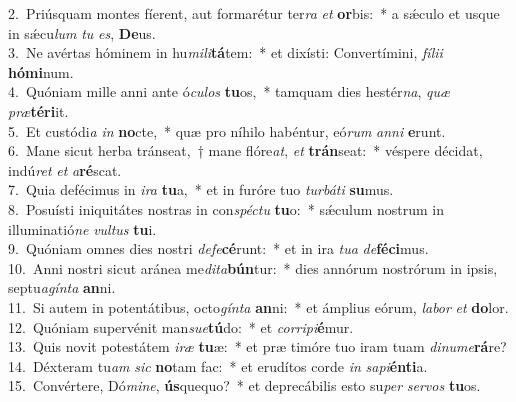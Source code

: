 {2.~}Priúsquam montes fíerent, aut formarétur ter\textit{ra} \textit{et} \textbf{or}bis:~* a sǽculo et usque in sǽcu\textit{lum} \textit{tu} \textit{es}, \textbf{De}us.\\
{3.~}Ne avértas hóminem in hu\textit{mi}\textit{li}\textbf{tá}tem:~* et dixísti: Convertímini, \textit{fí}\textit{li}\textit{i} \textbf{hó}\textbf{mi}num.\\
{4.~}Quóniam mille anni ante ó\textit{cu}\textit{los} \textbf{tu}os,~* tamquam dies hestér\textit{na}, \textit{quæ} \textit{præ}\textbf{té}\textbf{ri}it.\\
{5.~}Et custódi\textit{a} \textit{in} \textbf{no}cte,~* quæ pro níhilo habéntur, eó\textit{rum} \textit{an}\textit{ni} \textbf{e}runt.\\
{6.~}Mane sicut herba tránseat,~† mane flóre\textit{at}, \textit{et} \textbf{trán}seat:~* véspere décidat, indú\textit{ret} \textit{et} \textit{a}\textbf{ré}scat.\\
{7.~}Quia defécimus in \textit{i}\textit{ra} \textbf{tu}a,~* et in furóre tuo \textit{tur}\textit{bá}\textit{ti} \textbf{su}mus.\\
{8.~}Posuísti iniquitátes nostras in con\textit{spé}\textit{ctu} \textbf{tu}o:~* sǽculum nostrum in illuminatió\textit{ne} \textit{vul}\textit{tus} \textbf{tu}i.\\
{9.~}Quóniam omnes dies nostri \textit{de}\textit{fe}\textbf{cé}runt:~* et in ira \textit{tu}\textit{a} \textit{de}\textbf{fé}\textbf{ci}mus.\\
{10.~}Anni nostri sicut aránea me\textit{di}\textit{ta}\textbf{bún}tur:~* dies annórum nostrórum in ipsis, septu\textit{a}\textit{gín}\textit{ta} \textbf{an}ni.\\
{11.~}Si autem in potentátibus, octo\textit{gín}\textit{ta} \textbf{an}ni:~* et ámplius eórum, \textit{la}\textit{bor} \textit{et} \textbf{do}lor.\\
{12.~}Quóniam supervénit man\textit{su}\textit{e}\textbf{tú}do:~* et \textit{cor}\textit{ri}\textit{pi}\textbf{é}mur.\\
{13.~}Quis novit potestátem \textit{i}\textit{ræ} \textbf{tu}æ:~* et præ timóre tuo iram tuam \textit{di}\textit{nu}\textit{me}\textbf{rá}re?\\
{14.~}Déxteram tu\textit{am} \textit{sic} \textbf{no}tam fac:~* et erudítos corde \textit{in} \textit{sa}\textit{pi}\textbf{én}\textbf{ti}a.\\
{15.~}Convértere, Dó\textit{mi}\textit{ne}, \textbf{ús}quequo?~* et deprecábilis esto su\textit{per} \textit{ser}\textit{vos} \textbf{tu}os.\\
